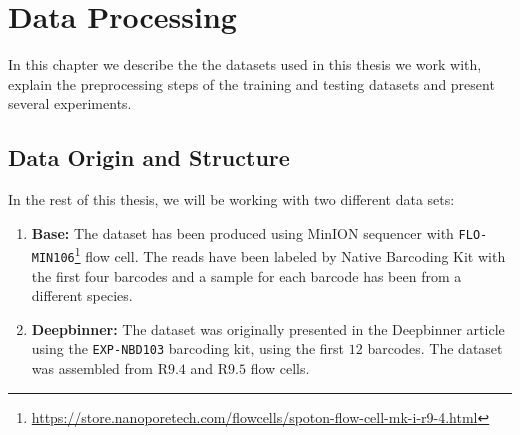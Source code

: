 \chapter{Data Processing}

\label{kap:data} %

\newcommand{\comment}[1]{}

In this chapter we describe the the datasets used in this thesis we work with, explain the preprocessing steps of the training and testing datasets and present several experiments.

\section{Data Origin and Structure}
\label{sec:data_structure}
In the rest of this thesis, we will be working with two different data sets:

\begin{enumerate}
    \item \textbf{Base:} The dataset has been produced using MinION sequencer with \texttt{FLO-MIN106}\footnote{\url{https://store.nanoporetech.com/flowcells/spoton-flow-cell-mk-i-r9-4.html}} flow cell. The reads have been labeled by Native Barcoding Kit with the first four barcodes and a sample for each barcode has been from a different species.
    \item \textbf{Deepbinner:} The dataset was originally presented in the Deepbinner article \cite{Deepbinner} using the \texttt{EXP-NBD103} barcoding kit, using the first $12$ barcodes. The dataset was assembled from R$9.4$ and R$9.5$ flow cells.
\end{enumerate}

